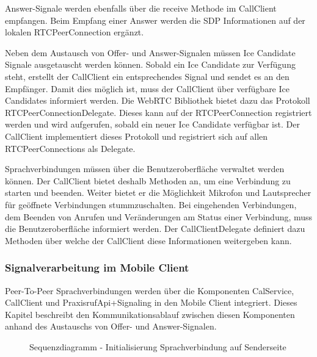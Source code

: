 Answer-Signale werden ebenfalls über die receive Methode im CallClient empfangen.
Beim Empfang einer Answer werden die SDP Informationen auf der lokalen RTCPeerConnection ergänzt.

Neben dem Austausch von Offer- und Answer-Signalen müssen Ice Candidate Signale ausgetauscht werden können.
Sobald ein Ice Candidate zur Verfügung steht, erstellt der CallClient ein entsprechendes Signal und sendet es an den Empfänger.
Damit dies möglich ist, muss der CallClient über verfügbare Ice Candidates informiert werden.
Die WebRTC Bibliothek bietet dazu das Protokoll RTCPeerConnectionDelegate.
Dieses kann auf der RTCPeerConnection registriert werden und wird aufgerufen, sobald ein neuer Ice Candidate verfügbar ist.
Der CallClient implementiert dieses Protokoll und registriert sich auf allen RTCPeerConnections als Delegate.

Sprachverbindungen müssen über die Benutzeroberfläche verwaltet werden können.
Der CallClient bietet deshalb Methoden an, um eine Verbindung zu starten und beenden.
Weiter bietet er die Möglichkeit Mikrofon und Lautsprecher für geöffnete Verbindungen stummzuschalten.
Bei eingehenden Verbindungen, dem Beenden von Anrufen und Veränderungen am Status einer Verbindung, muss die Benutzeroberfläche informiert werden.
Der CallClientDelegate definiert dazu Methoden über welche der CallClient diese Informationen weitergeben kann.

\subsubsection{Signalverarbeitung im Mobile Client}

Peer-To-Peer Sprachverbindungen werden über die Komponenten CalService, CallClient und PraxisrufApi+Signaling in den Mobile Client integriert.
Dieses Kapitel beschreibt den Kommunikationsablauf zwischen diesen Komponenten anhand des Austauschs von Offer- und Answer-Signalen.

\begin{figure}[h]
    \centering
    \begin{minipage}[b]{0.85\textwidth}
        \caption{Sequenzdiagramm - Initialisierung Sprachverbindung auf Senderseite }
    \end{minipage}
\end{figure}


